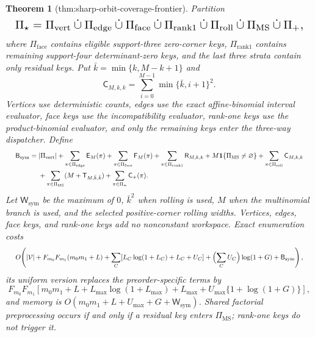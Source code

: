 \documentclass{article}
\newtheorem{theorem}{Theorem}
\begin{document}
\begin{theorem}[thm:sharp-orbit-coverage-frontier]
Partition
\[
\makebox[\linewidth][c]{\resizebox{0.98\linewidth}{!}{\(\displaystyle \Pi_\star=\Pi_{\mathrm{vert}}\mathbin{\dot\cup}\Pi_{\mathrm{edge}}
\mathbin{\dot\cup}\Pi_{\mathrm{face}}\mathbin{\dot\cup}
\Pi_{\mathrm{rank1}}\mathbin{\dot\cup}
\Pi_{\mathrm{roll}}\mathbin{\dot\cup}
\Pi_{\mathrm{MS}}\mathbin{\dot\cup}\Pi_+,\)}}
\]
where \(\Pi_{\mathrm{face}}\) contains eligible support-three zero-corner keys, \(\Pi_{\mathrm{rank1}}\) contains remaining support-four determinant-zero keys, and the last three strata contain only residual keys. Put \(\bar k=\min\{k,M-k+1\}\) and
\[
\mathsf C_{M,k,k}=\sum_{i=0}^{M-1}\min\{\bar k,i+1\}^2.
\]
Vertices use deterministic counts, edges use the exact affine-binomial interval evaluator, face keys use the incompatibility evaluator, rank-one keys use the product-binomial evaluator, and only the remaining keys enter the three-way dispatcher. Define
\[
\makebox[\linewidth][c]{\resizebox{0.98\linewidth}{!}{\(\displaystyle \begin{aligned}
\mathsf B_{\mathrm{sym}}={}&|\Pi_{\mathrm{vert}}|
+\sum_{\pi\in\Pi_{\mathrm{edge}}}\mathsf E_M(\pi)
+\sum_{\pi\in\Pi_{\mathrm{face}}}\mathsf F_M(\pi)
+\sum_{\pi\in\Pi_{\mathrm{rank1}}}\mathsf R_{M,k,k}
+M\mathbf 1\{\Pi_{\mathrm{MS}}\ne\varnothing\}
+\sum_{\pi\in\Pi_{\mathrm{roll}}}\mathsf C_{M,k,k}\\
&+\sum_{\pi\in\Pi_{\mathrm{MS}}}
(M+\mathsf T_{M,\bar k,\bar k})
+\sum_{\pi\in\Pi_+}\mathsf C_+(\pi).
\end{aligned}\)}}
\]
Let \(\mathsf W_{\mathrm{sym}}\) be the maximum of \(0\), \(\bar k^2\) when rolling is used, \(M\) when the multinomial branch is used, and the selected positive-corner rolling widths. Vertices, edges, face keys, and rank-one keys add no nonconstant workspace. Exact enumeration costs
\[
\makebox[\linewidth][c]{\resizebox{0.98\linewidth}{!}{\(\displaystyle O\!\left(
|\mathcal V|+F_{m_0}F_{m_1}(m_0m_1+L)
+\sum_C[L_C\log(1+L_C)+L_C+U_C]
+\Bigl(\sum_CU_C\Bigr)\log(1+G)+\mathsf B_{\mathrm{sym}}
\right),\)}}
\]
its uniform version replaces the preorder-specific terms by
\[
F_{m_0}F_{m_1}
[m_0m_1+L+L_{\max}\log(1+L_{\max})+L_{\max}
+U_{\max}\{1+\log(1+G)\}],
\]
and memory is \(O(m_0m_1+L+U_{\max}+G+\mathsf W_{\mathrm{sym}})\). Shared factorial preprocessing occurs if and only if a residual key enters \(\Pi_{\mathrm{MS}}\); rank-one keys do not trigger it.


\end{theorem}
\end{document}
